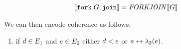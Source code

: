 \begin{align*}
  \sem{\FORKJOIN{\aGrp}} &= \sFORKJOIN{}\sem{\aGrp}  
\end{align*}

We can then encode coherence as follows.
\begin{enumerate}
  \setcounter{enumi}{\value{pomsetXSemiCount}}
\item if $\bEv\in\aEvs_1$ and $\aEv\in\aEvs_2$ either $\bEv<\SB0\aEv$ or $a\reorder\labeling_2(\aEv)$.
\end{enumerate}

